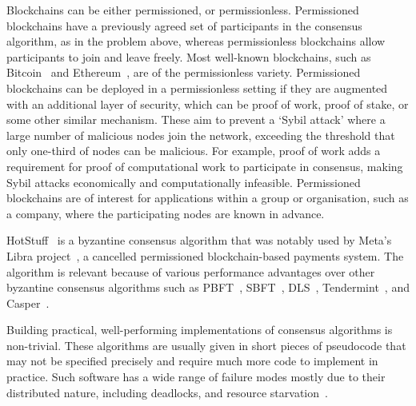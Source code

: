 Blockchains can be either permissioned, or permissionless. Permissioned blockchains have a previously agreed set of participants in the consensus algorithm, as in the problem above, whereas permissionless blockchains allow participants to join and leave freely. Most well-known blockchains, such as Bitcoin~\cite{nakamotoBitcoinPeertoPeerElectronic2008} and Ethereum~\cite{ethereumWhite, ethereumYellow}, are of the permissionless variety. Permissioned blockchains can be deployed in a permissionless setting if they are augmented with an additional layer of security, which can be proof of work, proof of stake, or some other similar mechanism. These aim to prevent a `Sybil attack' where a large number of malicious nodes join the network, exceeding the threshold that only one-third of nodes can be malicious. For example, proof of work adds a requirement for proof of computational work to participate in consensus, making Sybil attacks economically and computationally infeasible. Permissioned blockchains are of interest for applications within a group or organisation, such as a company, where the participating nodes are known in advance.

HotStuff~\cite{yinHotStuffBFTConsensus2019} is a byzantine consensus algorithm that was notably used by Meta's Libra project~\cite{baudetStateMachineReplication2019}, a cancelled permissioned blockchain-based payments system. The algorithm is relevant because of various performance advantages over other byzantine consensus algorithms such as PBFT~\cite{castroPracticalByzantineFault1999}, SBFT~\cite{golanguetaSBFTScalableDecentralized2019}, DLS~\cite{dworkConsensusPresencePartial1988}, Tendermint~\cite{kwonTendermintConsensusMining2014}, and Casper~\cite{buterinCasperFriendlyFinality2019}.

Building practical, well-performing implementations of consensus algorithms is non-trivial. These algorithms are usually given in short pieces of pseudocode that may not be specified precisely and require much more code to implement in practice. Such software has a wide range of failure modes mostly due to their distributed nature, including deadlocks, and resource starvation~\cite{chandraPaxosMadeLive2007}.

